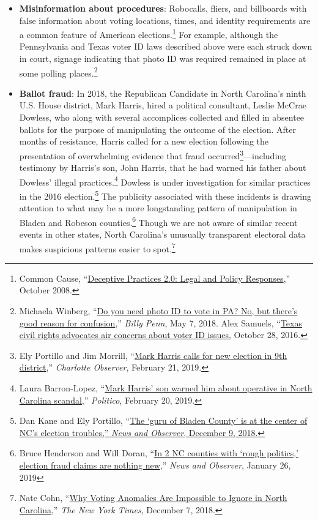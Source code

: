 \documentclass[12pt]{article}
\begin{document}
\begin{itemize}
\item \textbf{Misinformation about procedures}: Robocalls, fliers, and billboards with false information about voting locations, times, and identity requirements are a common feature of American elections.\footnote{Common Cause, ``\href{https://www.commoncause.org/resource/deceptive-practices-2-0-legal-and-policy-responses/}{Deceptive Practices 2.0: Legal and Policy Responses},'' October 2008.} For example, although the Pennsylvania and Texas voter ID laws described above were each struck down in court, signage indicating that photo ID was required remained in place at some polling places.\footnote{Michaela Winberg, ``\href{https://billypenn.com/2018/05/07/no-you-dont-need-photo-id-to-vote-in-pennsylvania/}{Do you need photo ID to vote in PA? No, but there's good reason for confusion},'' \emph{Billy Penn}, May 7, 2018. Alex Samuels, ``\href{https://www.texastribune.org/2016/10/28/early-voting-issues-texas/}{Texas civil rights advocates air concerns about voter ID issues}, October 28, 2016.}

\item \textbf{Ballot fraud}: In 2018, the Republican Candidate in North Carolina's ninth U.S. House district, Mark Harris, hired a political consultant, Leslie McCrae Dowless, who along with several accomplices collected and filled in absentee ballots for the purpose of manipulating the outcome of the election. After months of resistance, Harris called for a new election following the presentation of overwhelming evidence that fraud occurred\footnote{Ely Portillo and Jim Morrill, ``\href{https://www.charlotteobserver.com/news/politics-government/article226550555.html}{Mark Harris calls for new election in 9th district},'' \emph{Charlotte Observer}, February 21, 2019.}---including testimony by Harris's son, John Harris, that he had warned his father about Dowless' illegal practices.\footnote{Laura Barron-Lopez, ``\href{https://www.politico.com/story/2019/02/20/mark-harris-north-carolina-election-fraud-1192738}{Mark Harris' son warned him about operative in North Carolina scandal},'' \emph{Politico}, February 20, 2019.} Dowless is under investigation for similar practices in the 2016 election.\footnote{Dan Kane and Ely Portillo, ``\href{https://www.newsobserver.com/news/politics-government/article222806255.html}{The `guru of Bladen County' is at the center of NC’s election troubles,'' \emph{News and Observer}, December 9, 2018.}} The publicity associated with these incidents is drawing attention to what may be a more longstanding pattern of manipulation in Bladen and Robeson counties.\footnote{Bruce Henderson and Will Doran, ``\href{https://www.newsobserver.com/news/politics-government/election/article222739860.html}{In 2 NC counties with `rough politics,' election fraud claims are nothing new},'' \emph{News and Observer}, January 26, 2019} Though we are not aware of similar recent events in other states, North Carolina's unusually transparent electoral data makes suspicious patterns easier to spot.\footnote{Nate Cohn, ``\href{https://www.nytimes.com/2018/12/07/upshot/mapped-why-voting-anomalies-are-impossible-to-ignore-in-north-carolina.html}{Why Voting Anomalies Are Impossible to Ignore in North Carolina},'' \emph{The New York Times}, December 7, 2018.}


\end{itemize}
\end{document}
